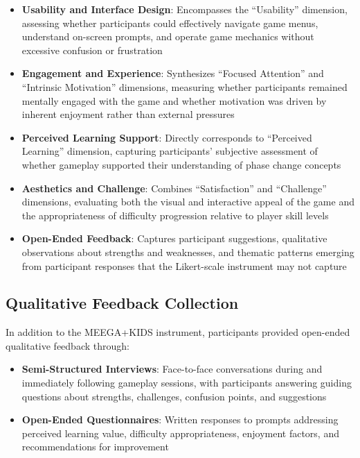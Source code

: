 \begin{itemize}
    \item \textbf{Usability and Interface Design}: Encompasses the ``Usability'' dimension, assessing whether participants could effectively navigate game menus, understand on-screen prompts, and operate game mechanics without excessive confusion or frustration
    
    \item \textbf{Engagement and Experience}: Synthesizes ``Focused Attention'' and ``Intrinsic Motivation'' dimensions, measuring whether participants remained mentally engaged with the game and whether motivation was driven by inherent enjoyment rather than external pressures
    
    \item \textbf{Perceived Learning Support}: Directly corresponds to ``Perceived Learning'' dimension, capturing participants' subjective assessment of whether gameplay supported their understanding of phase change concepts
    
    \item \textbf{Aesthetics and Challenge}: Combines ``Satisfaction'' and ``Challenge'' dimensions, evaluating both the visual and interactive appeal of the game and the appropriateness of difficulty progression relative to player skill levels
    
    \item \textbf{Open-Ended Feedback}: Captures participant suggestions, qualitative observations about strengths and weaknesses, and thematic patterns emerging from participant responses that the Likert-scale instrument may not capture
\end{itemize}

\subsection{Qualitative Feedback Collection}

In addition to the MEEGA+KIDS instrument, participants provided open-ended qualitative feedback through:

\begin{itemize}
    \item \textbf{Semi-Structured Interviews}: Face-to-face conversations during and immediately following gameplay sessions, with participants answering guiding questions about strengths, challenges, confusion points, and suggestions
    \item \textbf{Open-Ended Questionnaires}: Written responses to prompts addressing perceived learning value, difficulty appropriateness, enjoyment factors, and recommendations for improvement
\end{itemize}

